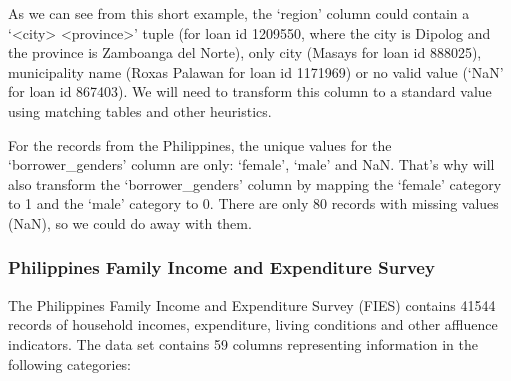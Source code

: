 \documentclass{article}
\begin{document}
As we can see from this short example, the ‘region’ column could contain a ‘<city> <province>’ tuple (for loan id 1209550, where the city is Dipolog and the province is Zamboanga del Norte), only city (Masays for loan id 888025), municipality name (Roxas Palawan for loan id 1171969) or no valid value (‘NaN’ for loan id 867403). We will need to transform this column to a standard value using matching tables and other heuristics.

For the records from the Philippines, the unique values for the ‘borrower\_genders’ column are only: ‘female’, ‘male’ and NaN. That’s why will also transform the ‘borrower\_genders’ column by mapping the ‘female’ category to 1 and the ‘male’ category to 0. There are only 80 records with missing values (NaN), so we could do away with them.

\subsubsection{Philippines Family Income and Expenditure Survey}
The Philippines Family Income and Expenditure Survey (FIES) contains 41544 records of household incomes, expenditure, living conditions and other affluence indicators. The data set contains 59 columns representing information in the following categories:
\end{document}
